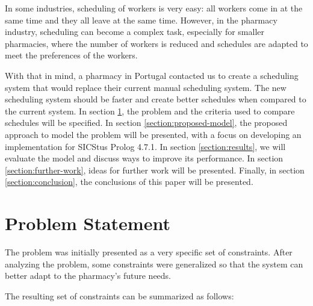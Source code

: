 \documentclass[conference]{IEEEtran}
\begin{document}
In some industries, scheduling of workers is very easy: all workers come in at the same time and they all leave at the same time.
However, in the pharmacy industry, scheduling can become a complex task, especially for smaller pharmacies, where the number of workers is reduced and schedules are adapted to meet the preferences of the workers.

With that in mind, a pharmacy in Portugal contacted us to create a scheduling system that would replace their current manual scheduling system. The new scheduling system should be faster and create better schedules when compared to the current system.
In section \ref{section:problem-statement}, the problem and the criteria used to compare schedules will be specified. In section \ref{section:proposed-model}, the proposed approach to model the problem will be presented, with a focus on developing an implementation for SICStus Prolog 4.7.1. In section \ref{section:results}, we will evaluate the model and discuss ways to improve its performance. In section \ref{section:further-work}, ideas for further work will be presented. Finally, in section \ref{section:conclusion}, the conclusions of this paper will be presented.

\section{Problem Statement}
\label{section:problem-statement}

The problem was initially presented as a very specific set of constraints.
After analyzing the problem, some constraints were generalized so that the system can better adapt to the pharmacy's future needs.

The resulting set of constraints can be summarized as follows:
\end{document}
